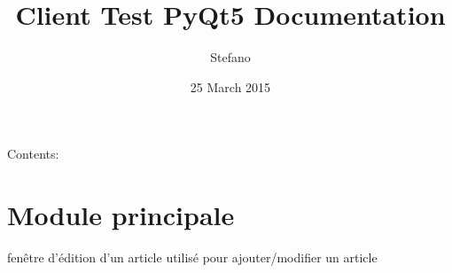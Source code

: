 \documentclass[letterpaper,10pt,french]{sphinxmanual}
\title{Client Test PyQt5 Documentation}
\date{25 March 2015}
\author{Stefano}
\begin{document}
\maketitle
\tableofcontents
{}\label{index::doc}


Contents:


\chapter{Module principale}
\label{main:module-principale}\label{main::doc}\label{main:module-main}\label{main:welcome-to-client-test-pyqt5-s-documentation}

\begin{fulllineitems}
\label{main:main.FormArticle}
fenêtre d'édition d'un article
utilisé pour ajouter/modifier un article

\begin{fulllineitems}
\label{main:main.FormArticle.AjouterArticle}
\end{fulllineitems}


\begin{fulllineitems}
\label{main:main.FormArticle.Annuler}
\end{fulllineitems}


\end{fulllineitems}

\end{document}
